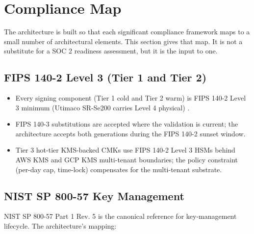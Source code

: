\section{Compliance Map}

\label{sec:compliance}

The architecture is built so that each significant compliance
framework maps to a small number of architectural elements. This
section gives that map. It is not a substitute for a SOC 2 readiness
assessment, but it is the input to one.

\subsection{FIPS 140-2 Level 3 (Tier 1 and Tier 2)}

\begin{itemize}[nosep]
\item Every signing component (Tier 1 cold and Tier 2 warm) is FIPS
140-2 Level 3 minimum (Utimaco SR-Se200 carries Level 4 physical)
\cite{nist-fips140-2,thales-luna7,utimaco-secsr,aws-cloudhsm,gcp-cloudhsm,yubihsm2}.
\item FIPS 140-3 substitutions \cite{nist-fips140-3} are accepted
where the validation is current; the architecture accepts both
generations during the FIPS 140-2 sunset window.
\item Tier 3 hot-tier KMS-backed CMKs use FIPS 140-2 Level 3 HSMs
behind AWS KMS and GCP KMS multi-tenant boundaries; the policy
constraint (per-day cap, time-lock) compensates for the multi-tenant
substrate.
\end{itemize}

\subsection{NIST SP 800-57 Key Management}

NIST SP 800-57 Part 1 Rev. 5 \cite{nist-sp800-57} is the canonical
reference for key-management lifecycle. The architecture's mapping:

